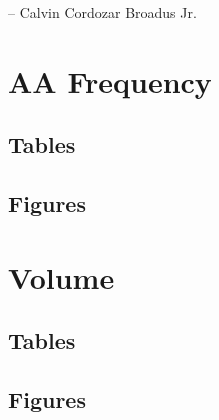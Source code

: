 \documentclass[12pt,oneside,a4paper]{report}
\begin{document}
		-- Calvin Cordozar Broadus Jr.
		
	
	
	
	\chapter*{}
	\tableofcontents
	\listoffigures
	\listoftables
	
	\pagebreak
	
	
	
		
	
	
	
	
		
	
	
	\printbibliography %
	
	\begin{appendices}
		\chapter{AA Frequency}
			\section{Tables}
				
			\section{Figures}
				
				
		\chapter{Volume}
			\section{Tables}
			\section{Figures}
	\end{appendices}
	
	
	
	
	
	
\end{document}
